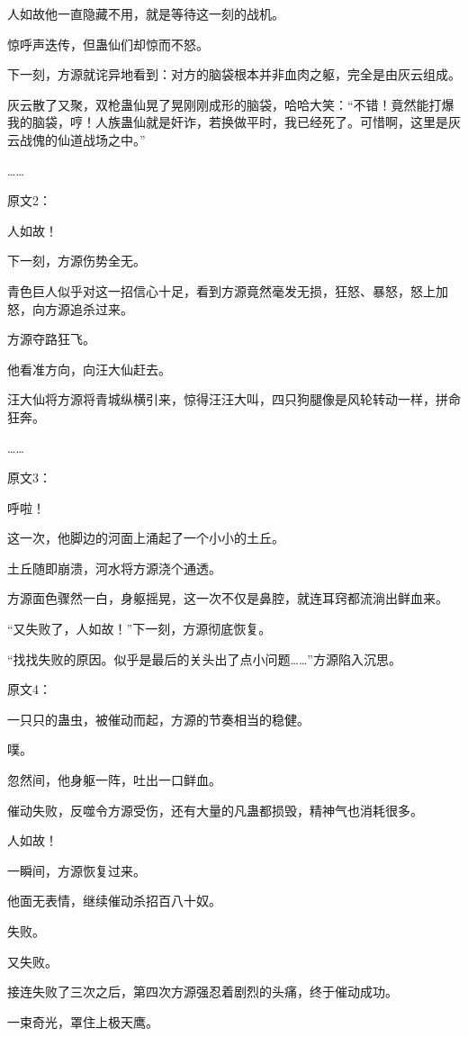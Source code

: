 \begin{this_body}
人如故他一直隐藏不用，就是等待这一刻的战机。

惊呼声迭传，但蛊仙们却惊而不怒。

下一刻，方源就诧异地看到：对方的脑袋根本并非血肉之躯，完全是由灰云组成。

灰云散了又聚，双枪蛊仙晃了晃刚刚成形的脑袋，哈哈大笑：“不错！竟然能打爆我的脑袋，哼！人族蛊仙就是奸诈，若换做平时，我已经死了。可惜啊，这里是灰云战傀的仙道战场之中。”

……

原文2：

人如故！

下一刻，方源伤势全无。

青色巨人似乎对这一招信心十足，看到方源竟然毫发无损，狂怒、暴怒，怒上加怒，向方源追杀过来。

方源夺路狂飞。

他看准方向，向汪大仙赶去。

汪大仙将方源将青城纵横引来，惊得汪汪大叫，四只狗腿像是风轮转动一样，拼命狂奔。

……

原文3：

呼啦！

这一次，他脚边的河面上涌起了一个小小的土丘。

土丘随即崩溃，河水将方源浇个通透。

方源面色骤然一白，身躯摇晃，这一次不仅是鼻腔，就连耳窍都流淌出鲜血来。

“又失败了，人如故！”下一刻，方源彻底恢复。

“找找失败的原因。似乎是最后的关头出了点小问题……”方源陷入沉思。

原文4：

一只只的蛊虫，被催动而起，方源的节奏相当的稳健。

噗。

忽然间，他身躯一阵，吐出一口鲜血。

催动失败，反噬令方源受伤，还有大量的凡蛊都损毁，精神气也消耗很多。

人如故！

一瞬间，方源恢复过来。

他面无表情，继续催动杀招百八十奴。

失败。

又失败。

接连失败了三次之后，第四次方源强忍着剧烈的头痛，终于催动成功。

一束奇光，罩住上极天鹰。


\end{this_body}
